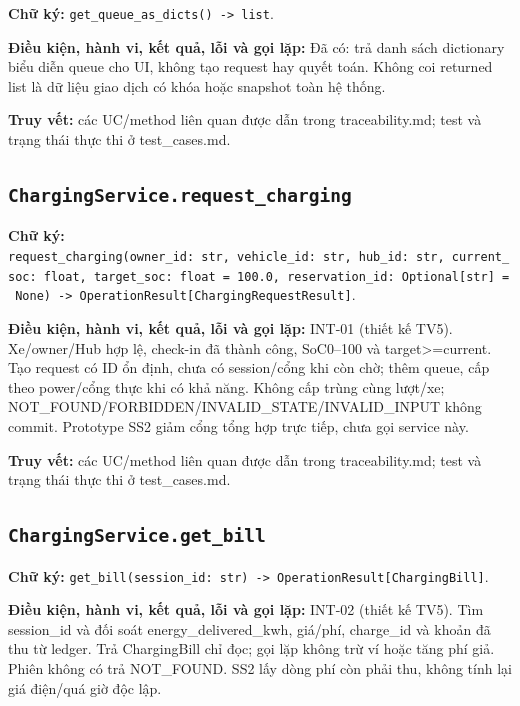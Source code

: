 \documentclass[11pt,a4paper]{article}
\begin{document}
\textbf{Chữ ký:}
\texttt{get\_queue\_as\_dicts()\ -\textgreater{}\ list}.

\textbf{Điều kiện, hành vi, kết quả, lỗi và gọi lặp:} Đã có: trả danh
sách dictionary biểu diễn queue cho UI, không tạo request hay quyết
toán. Không coi returned list là dữ liệu giao dịch có khóa hoặc snapshot
toàn hệ thống.

\textbf{Truy vết:} các UC/method liên quan được dẫn trong
traceability.md; test và trạng thái thực thi ở test\_cases.md.

\hypertarget{chargingservice.request_charging}{%
\subsection{\texorpdfstring{\texttt{ChargingService.request\_charging}}{ChargingService.request\_charging}}\label{chargingservice.request_charging}}

\textbf{Chữ ký:}
\texttt{request\_charging(owner\_id:\ str,\ vehicle\_id:\ str,\ hub\_id:\ str,\ current\_soc:\ float,\ target\_soc:\ float\ =\ 100.0,\ reservation\_id:\ Optional{[}str{]}\ =\ None)\ -\textgreater{}\ OperationResult{[}ChargingRequestResult{]}}.

\textbf{Điều kiện, hành vi, kết quả, lỗi và gọi lặp:} INT-01 (thiết kế
TV5). Xe/owner/Hub hợp lệ, check-in đã thành công, SoC0--100 và
target\textgreater=current. Tạo request có ID ổn định, chưa có
session/cổng khi còn chờ; thêm queue, cấp theo power/cổng thực khi có
khả năng. Không cấp trùng cùng lượt/xe;
NOT\_FOUND/FORBIDDEN/INVALID\_STATE/INVALID\_INPUT không commit.
Prototype SS2 giảm cổng tổng hợp trực tiếp, chưa gọi service này.

\textbf{Truy vết:} các UC/method liên quan được dẫn trong
traceability.md; test và trạng thái thực thi ở test\_cases.md.

\hypertarget{chargingservice.get_bill}{%
\subsection{\texorpdfstring{\texttt{ChargingService.get\_bill}}{ChargingService.get\_bill}}\label{chargingservice.get_bill}}

\textbf{Chữ ký:}
\texttt{get\_bill(session\_id:\ str)\ -\textgreater{}\ OperationResult{[}ChargingBill{]}}.

\textbf{Điều kiện, hành vi, kết quả, lỗi và gọi lặp:} INT-02 (thiết kế
TV5). Tìm session\_id và đối soát energy\_delivered\_kwh, giá/phí,
charge\_id và khoản đã thu từ ledger. Trả ChargingBill chỉ đọc; gọi lặp
không trừ ví hoặc tăng phí giả. Phiên không có trả NOT\_FOUND. SS2 lấy
dòng phí còn phải thu, không tính lại giá điện/quá giờ độc lập.
\end{document}
